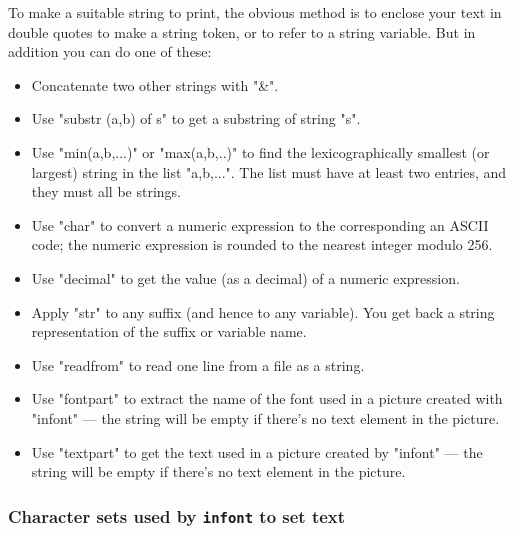 \documentclass[a4paper,landscape]{article}
\begin{document}
To make a suitable string to print, the obvious method is to enclose your text
in double quotes to make a string token, or to refer to a string variable.  But in
addition you can do one of these:
\begin{itemize}
    \item Concatenate two other strings with "&".

    \item Use "substr (a,b) of s" to get a substring of string "s".

    \item Use "min(a,b,...)" or "max(a,b,..)" to find the lexicographically smallest
        (or largest) string in the list "a,b,...".  The list must have at least two
        entries, and they must all be strings. 

    \item Use "char" to convert a numeric expression to the corresponding an ASCII
        code;
          the numeric expression is rounded to the nearest integer modulo
          256.
    
    \item Use "decimal" to get
        the value (as a decimal) of a numeric expression.

    \item Apply "str" to any suffix (and hence to any variable).  You get back a
        string representation of the suffix or variable name.

    \item Use "readfrom" to read one line from a file as a string.

    \item Use "fontpart" to extract the name of the font used in a picture created
        with "infont" --- the string will be empty if there's no text element in the
        picture.

    \item Use "textpart" to get the text used in a picture created by "infont" ---
        the string will be empty if there's no text element in the picture.

\end{itemize}

\newpage
\subsubsection{Character sets used by \texttt{infont} to set text} 
\end{document}
